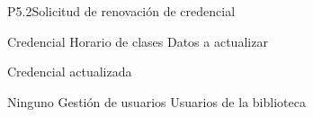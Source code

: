 \begin{Proceso}{P5.2}{Solicitud de renovación de credencial}
   { %
    \begin{UClist}
      \UCli Credencial
      \UCli Horario de clases
      \UCli Datos a actualizar
    \end {UClist}
  }
  
   { %
  }

   { %
    Credencial actualizada
  }

   { %
  }

   { %
    Ninguno
  }
   { %
    Gestión de usuarios
  }
   { %
    Usuarios de la biblioteca
  }


\end{Proceso}

